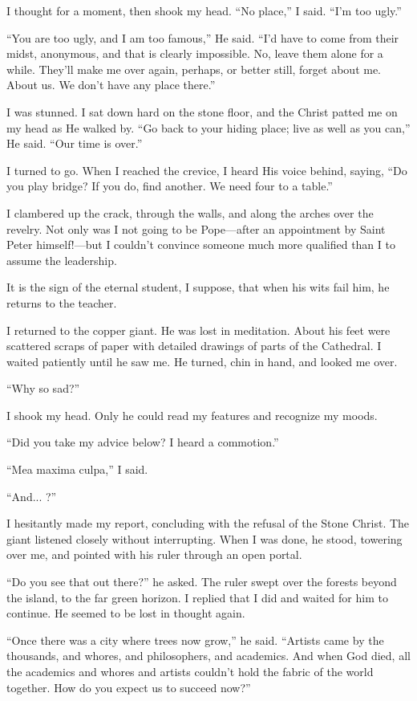 I thought for a moment, then shook my head. “No place,” I said. “I’m too ugly.”

“You are too ugly, and I am too famous,” He said. “I’d have to come from their midst, anonymous, and that is clearly impossible. No, leave them alone for a while. They’ll make me over again, perhaps, or better still, forget about me. About us. We don’t have any place there.”

I was stunned. I sat down hard on the stone floor, and the Christ patted me on my head as He walked by. “Go back to your hiding place; live as well as you can,” He said. “Our time is over.”

I turned to go. When I reached the crevice, I heard His voice behind, saying, “Do you play bridge? If you do, find another. We need four to a table.”

I clambered up the crack, through the walls, and along the arches over the revelry. Not only was I not going to be Pope—after an appointment by Saint Peter himself!—but I couldn’t convince someone much more qualified than I to assume the leadership.

It is the sign of the eternal student, I suppose, that when his wits fail him, he returns to the teacher.

I returned to the copper giant. He was lost in meditation. About his feet were scattered scraps of paper with detailed drawings of parts of the Cathedral. I waited patiently until he saw me. He turned, chin in hand, and looked me over.

“Why so sad?”

I shook my head. Only he could read my features and recognize my moods.

“Did you take my advice below? I heard a commotion.”

“Mea maxima culpa,” I said.

“And... ?”

I hesitantly made my report, concluding with the refusal of the Stone Christ. The giant listened closely without interrupting. When I was done, he stood, towering over me, and pointed with his ruler through an open portal.

“Do you see that out there?” he asked. The ruler swept over the forests beyond the island, to the far green horizon. I replied that I did and waited for him to continue. He seemed to be lost in thought again.

“Once there was a city where trees now grow,” he said. “Artists came by the thousands, and whores, and philosophers, and academics. And when God died, all the academics and whores and artists couldn’t hold the fabric of the world together. How do you expect us to succeed now?”

